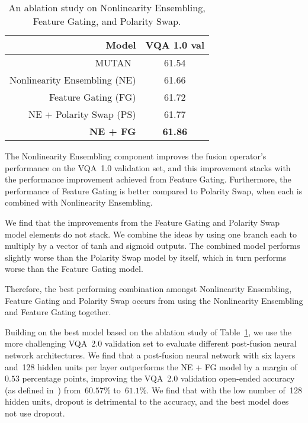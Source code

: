 \begin{table}[!t]
\centering
\caption{An ablation study on Nonlinearity Ensembling, Feature Gating, and
         Polarity Swap.}
\begin{tabular}{rc}
\textbf{Model} & \textbf{VQA 1.0 val} \\
\midrule
MUTAN~\cite{ben2017mutan} & 61.54 \\
\midrule
Nonlinearity Ensembling (NE) & 61.66 \\
Feature Gating (FG) & 61.72 \\
NE + Polarity Swap (PS) & 61.77 \\
\textbf{NE + FG} & \textbf{61.86} \\
\end{tabular}
\label{tab:model-ablation}
\end{table}

The Nonlinearity Ensembling component improves the fusion operator's
performance on the VQA~1.0 validation set, and this improvement stacks with
the performance improvement achieved from Feature Gating. Furthermore, the
performance of Feature Gating is better compared to Polarity Swap, when each
is combined with Nonlinearity Ensembling.

We find that the improvements from the Feature Gating and Polarity Swap model
elements do not stack. We combine the ideas by using one branch each to
multiply by a vector of tanh and sigmoid outputs. The combined model performs
slightly worse than the Polarity Swap model by itself, which in turn performs
worse than the Feature Gating model.

Therefore, the best performing combination amongst Nonlinearity Ensembling,
Feature Gating and Polarity Swap occurs from using the Nonlinearity Ensembling
and Feature Gating together.

Building on the best model based on the ablation study of
Table~\ref{tab:model-ablation}, we use the more challenging VQA~2.0 validation
set to evaluate different post-fusion neural network architectures. We find
that a post-fusion neural network with six layers and~\num{128} hidden units
per layer outperforms the NE + FG model by a margin of~$0.53$ percentage
points, improving the VQA~2.0 validation open-ended accuracy (as defined
in~\cite{goyal2017making}) from~$60.57\%$ to~$61.1\%$. We find that with the
low number of~\num{128} hidden units, dropout is detrimental to the accuracy,
and the best model does not use dropout.

